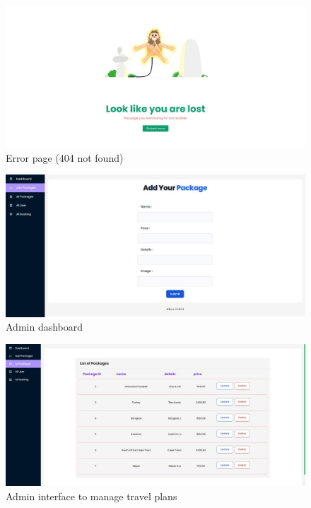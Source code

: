 \documentclass{scrreprt}
\begin{document}
\begin{figure}[h!]
    \centering
    \includegraphics[width=1.1\textwidth, height=0.35\textheight]{./SS/error.jpg}
    \caption{Error page (404 not found)}
    \label{fig:error}
\end{figure}

\begin{figure}[h!]
    \centering
    \includegraphics[width=1.1\textwidth, height=0.35\textheight]{./SS/admin.jpg}
    \caption{Admin dashboard}
    \label{fig:admin}
\end{figure}

\begin{figure}[h!]
    \centering
    \includegraphics[width=1.1\textwidth, height=0.35\textheight]{./SS/manage_plan.jpg}
    \caption{Admin interface to manage travel plans}
    \label{fig:manage_plan}
\end{figure}
\end{document}

